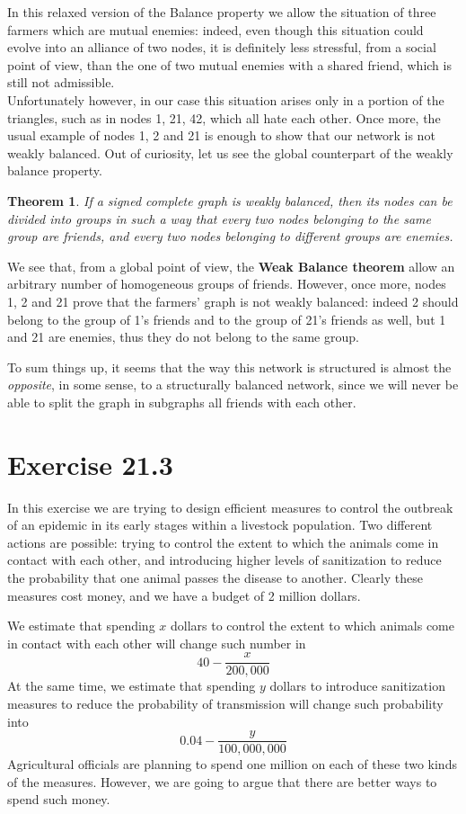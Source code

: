 \documentclass{report}
\newtheorem*{thm}{Theorem}
\theoremstyle{definition}
\theoremstyle{remark}
\begin{document}
In this relaxed version of the Balance property we allow the situation of three farmers which are mutual enemies: indeed, even though this situation could evolve into an alliance of two nodes, it is definitely less stressful, from a social point of view, than the one of two mutual enemies with a shared friend, which is still not admissible.\\
Unfortunately however, in our case this situation arises only in a portion of the triangles, such as in nodes 1, 21, 42, which all hate each other. Once more, the usual example of nodes 1, 2 and 21 is enough to show that our network is not weakly balanced. Out of curiosity, let us see the global counterpart of the weakly balance property.
\begin{thm}
	If a signed complete graph is weakly balanced, then its nodes can be divided into groups in such a way that every two nodes belonging to the same group are friends, and every two nodes belonging to different groups are enemies. 
\end{thm}
We see that, from a global point of view, the \textbf{Weak Balance theorem} allow an arbitrary number of homogeneous groups of friends. However, once more, nodes 1, 2 and 21 prove that the farmers' graph is not weakly balanced: indeed 2 should belong to the group of 1's friends and to the group of 21's friends as well, but 1 and 21 are enemies, thus they do not belong to the same group.

To sum things up, it seems that the way this network is structured is almost the \textit{opposite}, in some sense, to a structurally balanced network, since we will never be able to split the graph in subgraphs all friends with each other.
\newpage

\section*{Exercise 21.3}
In this exercise we are trying to design efficient measures to control the outbreak of an epidemic in its early stages within a livestock  population. Two different actions are possible: trying to control the extent to which the
animals come in contact with each other, and introducing higher levels of sanitization to reduce the probability that one animal passes the disease to another. Clearly these measures cost money, and we have a budget of 2 million dollars.

We estimate that spending $x$ dollars to control the extent to which animals come in contact with each other will change such number in
\begin{equation*}
40-\frac{x}{200,000}
\end{equation*}
At the same time, we estimate that spending $y$ dollars to introduce sanitization measures to reduce the probability of transmission will change such probability into
\begin{equation*}
0.04-\frac{y}{100,000,000}
\end{equation*}
Agricultural officials are planning to spend one million on each of these two kinds of the measures. However, we are going to argue that there are better ways to spend such money.
\end{document}
